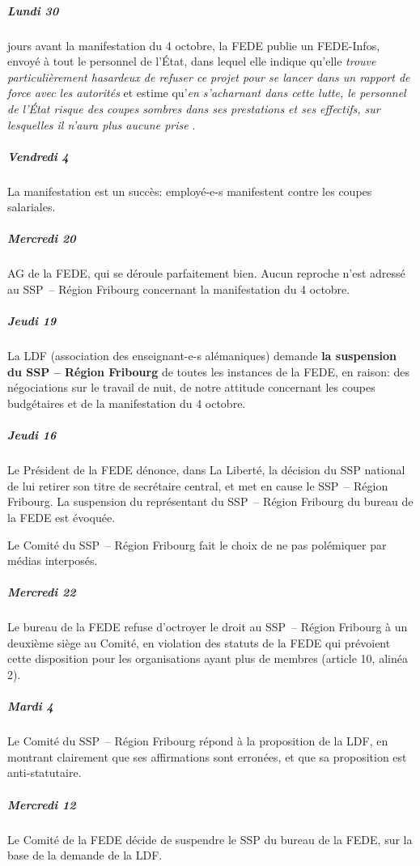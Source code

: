 \subparagraph{Lundi 30}%
 jours avant la manifestation du 4 octobre, la FEDE publie un FEDE-Infos, envoyé à tout le personnel de l'État,
	dans lequel elle indique qu'elle
	\og \emph{trouve particulièrement hasardeux de refuser ce projet pour se lancer dans un rapport
	de force avec les autorités} \fg
	et estime qu'\og \emph{en s'acharnant dans cette lutte, le personnel de l'État risque des coupes
	sombres dans ses prestations et ses effectifs, sur lesquelles il n'aura plus aucune prise} \fg.

\subparagraph{Vendredi 4}%
La manifestation est un succès:  employé-e-s manifestent contre les coupes salariales.

\subparagraph{Mercredi 20}%
AG de la FEDE, qui se déroule parfaitement bien.
Aucun reproche n'est adressé au SSP~– Région Fribourg concernant la manifestation du 4 octobre.

\subparagraph{Jeudi 19}%
La LDF (association des enseignant-e-s alémaniques)
demande \textbf{la suspension du SSP – Région Fribourg} de toutes les instances de la FEDE, en raison:
des négociations sur le travail de nuit, de notre attitude concernant les \og coupes budgétaires \fg et de la manifestation du 4 octobre.

\subparagraph{Jeudi 16}%
Le Président de la FEDE dénonce, dans La Liberté, la décision du SSP national de lui retirer son titre de secrétaire central, et met en cause le SSP~– Région Fribourg.
La suspension du représentant du SSP~– Région Fribourg du bureau de la FEDE est évoquée.

Le Comité du SSP~– Région Fribourg fait le choix de ne pas polémiquer par médias interposés.

\subparagraph{Mercredi 22}%
Le bureau de la FEDE refuse d'octroyer le droit au SSP~– Région Fribourg à un deuxième siège au Comité, en violation des statuts de la FEDE qui prévoient cette disposition pour les organisations ayant plus de  membres (article 10, alinéa 2).

\subparagraph{Mardi 4}%
Le Comité du SSP~– Région Fribourg répond à la proposition de la LDF, en montrant clairement que ses affirmations sont erronées, et que sa proposition est anti-statutaire.

\subparagraph{Mercredi 12}%
Le Comité de la FEDE décide de suspendre le SSP du bureau de la FEDE, sur la base de la demande de la LDF.

